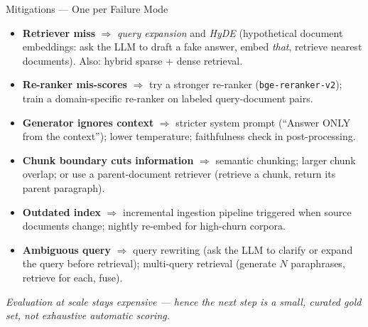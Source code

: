 \begin{frame}{Mitigations --- One per Failure Mode}
\begin{itemize}
\item \textbf{Retriever miss} $\Rightarrow$ \emph{query expansion} and \emph{HyDE} (hypothetical document embeddings: ask the LLM to draft a fake answer, embed \emph{that}, retrieve nearest documents). Also: hybrid sparse + dense retrieval.

\smallskip
\item \textbf{Re-ranker mis-scores} $\Rightarrow$ try a stronger re-ranker (\texttt{bge-reranker-v2}); train a domain-specific re-ranker on labeled query-document pairs.

\smallskip
\item \textbf{Generator ignores context} $\Rightarrow$ stricter system prompt (``Answer ONLY from the context''); lower temperature; faithfulness check in post-processing.

\smallskip
\item \textbf{Chunk boundary cuts information} $\Rightarrow$ semantic chunking; larger chunk overlap; or use a parent-document retriever (retrieve a chunk, return its parent paragraph).

\smallskip
\item \textbf{Outdated index} $\Rightarrow$ incremental ingestion pipeline triggered when source documents change; nightly re-embed for high-churn corpora.

\smallskip
\item \textbf{Ambiguous query} $\Rightarrow$ query rewriting (ask the LLM to clarify or expand the query before retrieval); multi-query retrieval (generate $N$ paraphrases, retrieve for each, fuse).
\end{itemize}

\smallskip
\centering\textit{\footnotesize Evaluation at scale stays expensive --- hence the next step is a small, curated gold set, not exhaustive automatic scoring.}
\end{frame}

